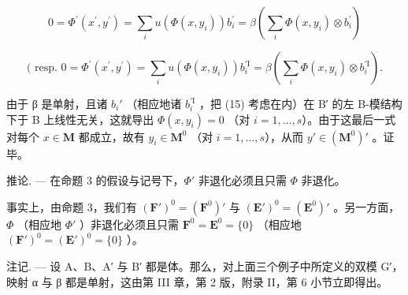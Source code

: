 \[
0 = \Phi^ {\prime} (x ^ {\prime}, y ^ {\prime}) = \sum_ {i} u (\Phi (x, y _ {i})) b _ {i} ^ {\prime} = \beta (\sum_ {i} \Phi (x, y _ {i}) \otimes b _ {i} ^ {\prime})
\]

\[
(\text { resp. } 0 = \Phi^ {\prime} (x ^ {\prime}, y ^ {\prime}) = \sum_ {i} u (\Phi (x, y _ {i})) b _ {i} ^ {\prime \mathrm{I}} = \beta (\sum_ {i} \Phi (x, y _ {i}) \otimes b _ {i} ^ {\prime \mathrm{I}}).
\]

由于 β 是单射，且诸 \(b_i'\) （相应地诸 \(b _ {i} ^ {\prime \mathrm{I}}\) ，把 (15) 考虑在内）在 B′ 的左 B-模结构下于 B 上线性无关，这就导出 \(\Phi(x, y_i) = 0\) （对 \(i = 1, \ldots, s\)）。由于这最后一式对每个 \(x \in \mathbf{M}\) 都成立，故有 \(y_i \in \mathbf{M}^0\) （对 \(i = 1, \ldots, s\)），从而 \(y' \in (\mathbf{M}^0)'\) 。证毕。

推论. --- 在命题 3 的假设与记号下，\(\Phi'\) 非退化必须且只需 \(\Phi\) 非退化。

事实上，由命题 3，我们有 \((\mathbf{F}')^0 = (\mathbf{F}^0)'\) 与 \((\mathbf{E}')^0 = (\mathbf{E}^0)'\) 。另一方面，\(\Phi\) （相应地 \(\Phi'\) ）非退化必须且只需 \(\mathbf{F}^0 = \mathbf{E}^0 = \{0\}\) （相应地 \((\mathbf{F}')^0 = (\mathbf{E}')^0 = \{0\}\) ）。

注记. --- 设 A、B、A′ 与 B′ 都是体。那么，对上面三个例子中所定义的双模 G′，映射 α 与 β 都是单射，这由第 III 章，第 2 版，附录 II，第 6 小节立即得出。

